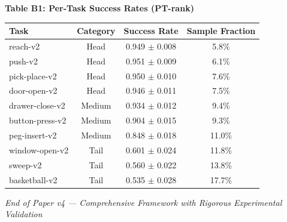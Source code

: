 \documentclass[11pt, a4paper, oneside]{article}
\theoremstyle{plain}
\theoremstyle{break}
\theoremstyle{plain}
\theoremstyle{breakdef}
\theoremstyle{plain}
\theoremstyle{breakrem}
\theoremstyle{plain}
\theoremstyle{breakrem}
\begin{document}
\textbf{Table B1: Per-Task Success Rates (PT-rank)}
\begin{table}[htbp]
\centering
\begin{tabular}{lccc}
\toprule
Task & Category & Success Rate & Sample Fraction \\
\midrule
reach-v2 & Head & 0.949 $\pm$ 0.008 & 5.8\% \\
push-v2 & Head & 0.951 $\pm$ 0.009 & 6.1\% \\
pick-place-v2 & Head & 0.950 $\pm$ 0.010 & 7.6\% \\
door-open-v2 & Head & 0.946 $\pm$ 0.011 & 7.5\% \\
drawer-close-v2 & Medium & 0.934 $\pm$ 0.012 & 9.4\% \\
button-press-v2 & Medium & 0.904 $\pm$ 0.015 & 9.3\% \\
peg-insert-v2 & Medium & 0.848 $\pm$ 0.018 & 11.0\% \\
window-open-v2 & Tail & 0.601 $\pm$ 0.024 & 11.8\% \\
sweep-v2 & Tail & 0.560 $\pm$ 0.022 & 13.8\% \\
basketball-v2 & Tail & 0.535 $\pm$ 0.028 & 17.7\% \\
\bottomrule
\end{tabular}
\end{table}

\vfill

\noindent \textit{End of Paper v4 --- Comprehensive Framework with Rigorous Experimental Validation}
\end{document}
